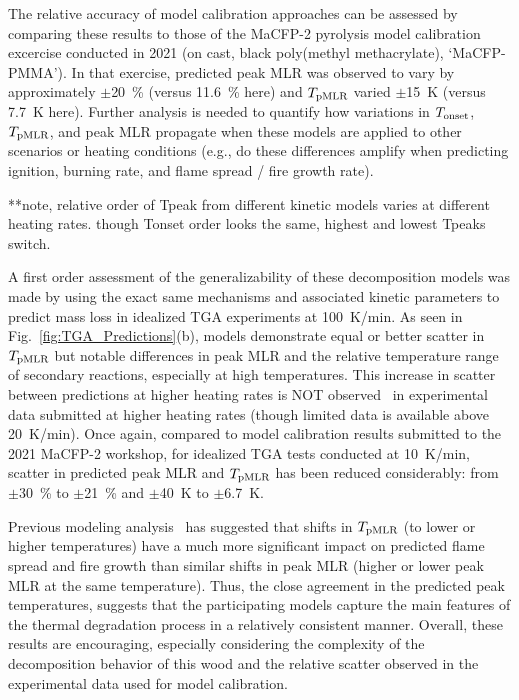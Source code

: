 \documentclass{article}
\begin{document}
The relative accuracy of model calibration approaches can be assessed by comparing these results to those of the MaCFP-2 pyrolysis model calibration excercise conducted in 2021 (on cast, black poly(methyl methacrylate), `MaCFP-PMMA'). In that exercise, predicted peak MLR was observed to vary by approximately $\pm$20~\% (versus 11.6~\% here) and $T_{\rm{pMLR}}$ varied $\pm$15~K (versus 7.7~K here). Further analysis is needed to quantify how variations in $T_{\rm{onset}}$, $T_{\rm{pMLR}}$, and peak MLR propagate when these models are applied to other scenarios or heating conditions (e.g., do these differences amplify when predicting ignition, burning rate, and flame spread / fire growth rate). 

**note, relative order of Tpeak from different kinetic models varies at different heating rates. though Tonset order looks the same, highest and lowest Tpeaks switch.

A first order assessment of the generalizability of these decomposition models was made by using the exact same mechanisms and associated kinetic parameters to predict mass loss in idealized TGA experiments at 100~K/min. As seen in Fig.~\ref{fig:TGA_Predictions}(b), models demonstrate equal or better scatter in $T_{\rm{pMLR}}$ but notable differences in peak MLR and the relative temperature range of secondary reactions, especially at high temperatures. This increase in scatter between predictions at higher heating rates is NOT observed~\cite{MaCFP4PyrolysisExp} in experimental data submitted at higher heating rates (though limited data is available above 20~K/min). Once again, compared to model calibration results submitted to the 2021 MaCFP-2 workshop, for idealized TGA tests conducted at 10~K/min, scatter in predicted peak MLR and $T_{\rm{pMLR}}$ has been reduced considerably: from $\pm$30~\% to $\pm$21~\% and $\pm$40~K to $\pm$6.7~K.

Previous modeling analysis~\cite{ding2023analysis} has suggested that shifts in $T_{\rm{pMLR}}$ (to lower or higher temperatures) have a much more significant impact on predicted flame spread and fire growth than similar shifts in peak MLR (higher or lower peak MLR at the same temperature). Thus, the close agreement in the predicted peak temperatures, suggests that the participating models capture the main features of the thermal degradation process in a relatively consistent manner. Overall, these results are encouraging, especially considering the complexity of the decomposition behavior of this wood and the relative scatter observed in the experimental data used for model calibration. 
\end{document}
